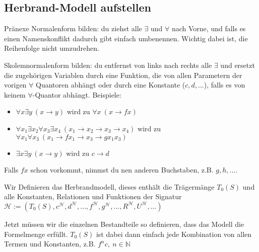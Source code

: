 \documentclass[
    ngerman,
    color=3b,
    summary,
    boxarc,
    main,
    fleqn,
    leqno,
]{rubos-tuda-template}
\begin{document}
    \subsection{Herbrand-Modell aufstellen}
    \begin{steps}
        \item Pränexe Normalenform bilden: du ziehst alle $\exists$ und $\forall$ nach Vorne, und falls es einen Namenskonflikt dadurch gibt einfach umbenennen. Wichtig dabei ist, die Reihenfolge nicht umzudrehen.
        \item Skolemnormalenform bilden: du entfernst von links nach rechts alle $\exists$ und ersetzt die zugehörigen Variablen durch eine Funktion, die von allen Parametern der vorigen $\forall$ Quantoren abhängt oder durch eine Konstante ($c,d,\dots$), falls es von keinem $\forall$-Quantor abhängt.
        Beispiele:\begin{itemize}
            \item  $\forall x\exists y~\left(x\rightarrow y\right)$ wird zu $\forall x~\left(x\rightarrow fx\right)$
            \item  $\forall x_1\exists x_2\forall x_3\exists x_4~\left(x_1\rightarrow x_2\rightarrow x_3\rightarrow x_4\right)$ wird zu $\forall x_1\forall x_3~\left(x_1\rightarrow fx_1\rightarrow x_3\rightarrow gx_1x_3\right)$
            \item  $\exists x\exists y~\left(x\rightarrow y\right)$ wird zu $c\rightarrow d$
        \end{itemize} Falls $fx$ schon vorkommt, nimmst du nen anderen Buchstaben, z.B. $g,h,\dots$.
        \item Wir Definieren das Herbrandmodell, dieses enthält die Trägermänge $T_0(S)$ und alle Konstanten, Relationen und Funktionen der Signatur $\mathcal{H}:=(T_0(S),c^\mathcal{H},d^\mathcal{H},\dots,f^\mathcal{H},g^\mathcal{H},\dots,R^\mathcal{H},U^\mathcal{H},\dots)$
        \item Jetzt müssen wir die einzelnen Bestandteile so definieren, dass das Modell die Formelmenge erfüllt. $T_0(S)$ ist dabei dann einfach jede Kombination von allen Termen und Konstanten, z.B. $f^nc,~n\in \mathbb{N}$
    \end{steps}
    \vspace{-2cm}\vspace{\fill}
\end{document}
